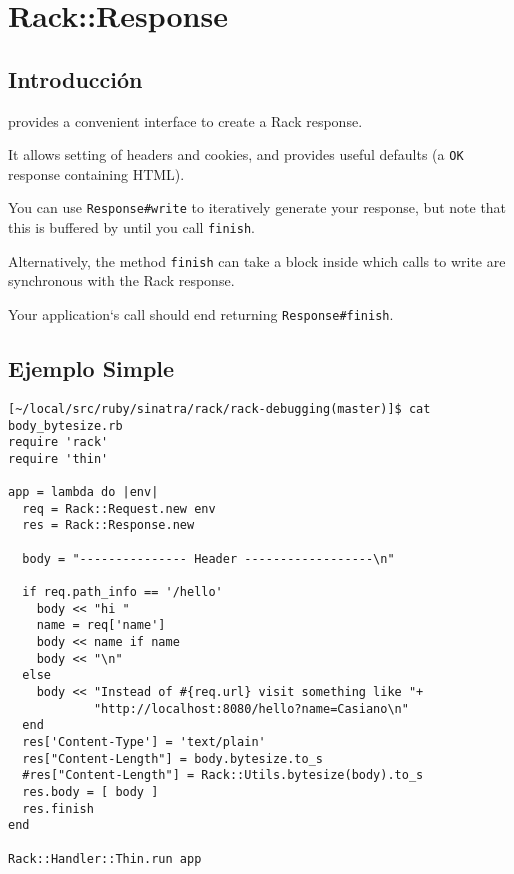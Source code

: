 \section{Rack::Response}

\subsection{Introducción}

\rackresponse{} provides a convenient interface to create a Rack response.

It allows setting of headers and cookies, and provides useful
defaults (a \verb|OK| response containing HTML).

You can use \verb|Response#write| to iteratively generate your response,
but note that this is buffered by \rackresponse{} until you call
\verb|finish|. 

Alternatively, the method \verb|finish| can take a block inside which calls to write
are synchronous with the Rack response.

Your application‘s call should end returning \verb|Response#finish|.

\subsection{Ejemplo Simple}
\begin{verbatim}
[~/local/src/ruby/sinatra/rack/rack-debugging(master)]$ cat body_bytesize.rb 
require 'rack'
require 'thin'

app = lambda do |env|
  req = Rack::Request.new env
  res = Rack::Response.new

  body = "--------------- Header ------------------\n"

  if req.path_info == '/hello'
    body << "hi "
    name = req['name']
    body << name if name 
    body << "\n"
  else
    body << "Instead of #{req.url} visit something like "+
            "http://localhost:8080/hello?name=Casiano\n"
  end
  res['Content-Type'] = 'text/plain'
  res["Content-Length"] = body.bytesize.to_s
  #res["Content-Length"] = Rack::Utils.bytesize(body).to_s
  res.body = [ body ]
  res.finish
end

Rack::Handler::Thin.run app
\end{verbatim}

